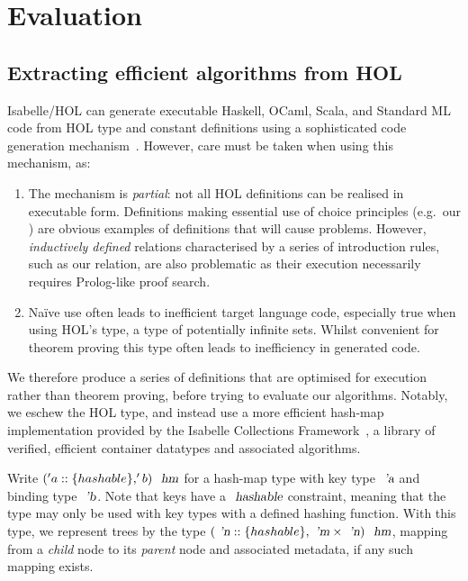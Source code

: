\documentclass[sigconf]{acmart}
\begin{document}
\section{Evaluation}\label{sec:evaluation}

\subsection{Extracting efficient algorithms from HOL} \label{subsect.extracting}

Isabelle/HOL can generate executable Haskell, OCaml, Scala, and Standard ML code from HOL type and constant definitions using a sophisticated code generation mechanism~\cite{DBLP:conf/flops/HaftmannN10}.
However,  care must be taken when using this mechanism, as:
\begin{enumerate}
\item
The mechanism is \emph{partial}: not all HOL definitions can be realised in executable form.
Definitions making essential use of choice principles (e.g.~our ) are obvious examples of definitions that will cause problems.
However, \emph{inductively defined} relations characterised by a series of introduction rules, such as our  relation, are also problematic as their execution necessarily requires Prolog-like proof search.
\item
Na\"{i}ve use often leads to inefficient target language code, especially true when using HOL's  type, a type of potentially infinite sets.
Whilst convenient for theorem proving this type often leads to inefficiency in generated code.
\end{enumerate}

We therefore produce a series of definitions that are optimised for execution rather than theorem proving, before trying to evaluate our algorithms.
Notably, we eschew the HOL  type, and instead use a more efficient hash-map implementation provided by the Isabelle Collections Framework~\cite{DBLP:conf/itp/LammichL10}, a library of verified, efficient container datatypes and associated algorithms.

Write $('a::\{hashable\}, 'b)\ \isa{hm}$ for a hash-map type with key type $\isa{'a}$ and binding type $\isa{'b}$.
Note that keys have a $\isa{hashable}$ constraint, meaning that the type may only be used with key types with a defined hashing function.
With this type, we represent trees by the type $(\isa{'n}::\{hashable\}, \isa{'m} \times \isa{'n})\ \isa{hm}$, mapping from a \emph{child} node to its \emph{parent} node and associated metadata, if any such mapping exists.
\end{document}
